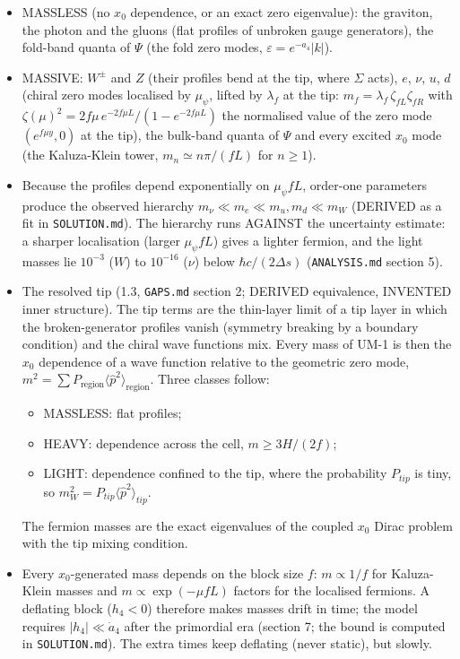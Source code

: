 \documentclass[11pt]{article}
\begin{document}
\begin{itemize}
\item MASSLESS (no $x_0$ dependence, or an exact zero eigenvalue): the graviton, the photon and the gluons (flat profiles of unbroken gauge generators), the fold-band quanta of $\Psi$ (the fold zero modes, $\varepsilon = e^{-a_4}|k|$).
\item MASSIVE: $W^\pm$ and $Z$ (their profiles bend at the tip, where $\Sigma$ acts), $e$, $\nu$, $u$, $d$ (chiral zero modes localised by $\mu_\psi$, lifted by $\lambda_f$ at the tip: $m_f = \lambda_f\,\zeta_{fL}\zeta_{fR}$ with $\zeta(\mu)^2 = 2f\mu\,e^{-2f\mu L}/(1 - e^{-2f\mu L})$ the normalised value of the zero mode $(e^{f\mu y}, 0)$ at the tip), the bulk-band quanta of $\Psi$ and every excited $x_0$ mode (the Kaluza-Klein tower, $m_n \simeq n\pi/(fL)$ for $n \geq 1$).
\item Because the profiles depend exponentially on $\mu_\psi f L$, order-one parameters produce the observed hierarchy $m_\nu \ll m_e \ll m_u, m_d \ll m_W$ (DERIVED as a fit in \texttt{SOLUTION.\allowbreak{}md}). The hierarchy runs AGAINST the uncertainty estimate: a sharper localisation (larger $\mu_\psi fL$) gives a lighter fermion, and the light masses lie $10^{-3}$ ($W$) to $10^{-16}$ ($\nu$) below $\hbar c/(2\Delta s)$ (\texttt{ANALYSIS.\allowbreak{}md} section 5).
\item The resolved tip (1.3, \texttt{GAPS.\allowbreak{}md} section 2; DERIVED equivalence, INVENTED inner structure). The tip terms are the thin-layer limit of a tip layer in which the broken-generator profiles vanish (symmetry breaking by a boundary condition) and the chiral wave functions mix. Every mass of UM-1 is then the $x_0$ dependence of a wave function relative to the geometric zero mode, $m^2 = \sum P_{\text{region}}\langle\hat p^2\rangle_{\text{region}}$. Three classes follow:
\begin{itemize}
\item MASSLESS: flat profiles;
\item HEAVY: dependence across the cell, $m \geq 3H/(2f)$;
\item LIGHT: dependence confined to the tip, where the probability $P_{tip}$ is tiny, so $m_W^2 = P_{tip}\langle\hat p^2\rangle_{tip}$.
\end{itemize}
The fermion masses are the exact eigenvalues of the coupled $x_0$ Dirac problem with the tip mixing condition.
\item Every $x_0$-generated mass depends on the block size $f$: $m \propto 1/f$ for Kaluza-Klein masses and $m \propto \exp(-\mu f L)$ factors for the localised fermions. A deflating block ($h_4 < 0$) therefore makes masses drift in time; the model requires $|h_4| \ll \dot a_4$ after the primordial era (section 7; the bound is computed in \texttt{SOLUTION.\allowbreak{}md}). The extra times keep deflating (never static), but slowly.
\end{itemize}
\end{document}
